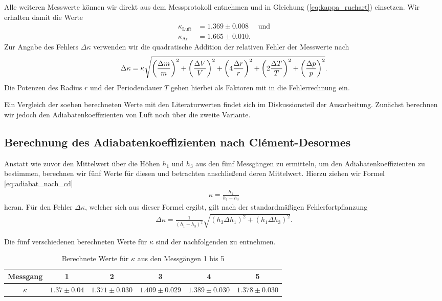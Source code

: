 Alle weiteren Messwerte können wir direkt aus dem Messprotokoll entnehmen und in Gleichung (\ref{eq:kappa_ruchart}) einsetzen. Wir erhalten damit die Werte
\begin{align}
  \kappa_{\text{Luft}} &= 1.369 \pm 0.008 \quad\text{ und}\\[1em]
  \kappa_{\text{Ar}} &= 1.665 \pm 0.010.
\end{align}
Zur Angabe des Fehlers $\Delta \kappa$ verwenden wir die quadratische Addition der relativen Fehler der Messwerte nach
\begin{align}
  \Delta \kappa = \kappa \sqrt{\qty(\frac{\Delta m}{m})^2 + \qty(\frac{\Delta V}{V})^2 + \qty(4\frac{\Delta r}{r})^2 + \qty(2\frac{\Delta T}{T})^2 + \qty(\frac{\Delta p}{p})^2}.
\end{align}
Die Potenzen des Radius $r$ und der Periodendauer $T$ gehen hierbei als Faktoren mit in die Fehlerrechnung ein.

Ein Vergleich der soeben berechneten Werte mit den Literaturwerten findet sich im Diskussionsteil der Ausarbeitung. Zunächst berechnen wir jedoch den Adiabatenkoeffizienten von Luft noch über die zweite Variante.

\subsection{Berechnung des Adiabatenkoeffizienten nach Clément-Desormes}

Anstatt wie zuvor den Mittelwert über die Höhen $h_1$ und $h_3$ aus den fünf Messgängen zu ermitteln, um den Adiabatenkoeffizienten zu bestimmen, berechnen wir fünf Werte für diesen und betrachten anschließend deren Mittelwert. Hierzu ziehen wir Formel \ref{eq:adiabat_nach_cd} 
\begin{align}
  \kappa = \frac{h_1}{h_1 - h_3}
\end{align}
heran. Für den Fehler $\Delta \kappa$, welcher sich aus dieser Formel ergibt, gilt nach der standardmäßigen Fehlerfortpflanzung
\begin{align}
  \Delta \kappa = \frac{1}{(h_1 - h_3)^2} \sqrt{(h_3 \Delta h_1)^2 + (h_1 \Delta h_3)^2}.
\end{align}

Die fünf verschiedenen berechneten Werte für $\kappa$ sind der nachfolgenden  zu entnehmen.

\begin{table}[H]
  \centering
  \begin{tabular}{c|c|c|c|c|c}
    Messgang & 1 & 2 & 3 & 4 & 5 \\ \hline
    $\kappa$ & $1.37 \pm 0.04$ & $1.371 \pm 0.030$ & $1.409 \pm 0.029$ & $1.389 \pm 0.030$ & $1.378 \pm 0.030$ \\
  \end{tabular}
  \caption{Berechnete Werte für $\kappa$ aus den Messgängen 1 bis 5}
  \label{tab:kappa_vals}
\end{table}

